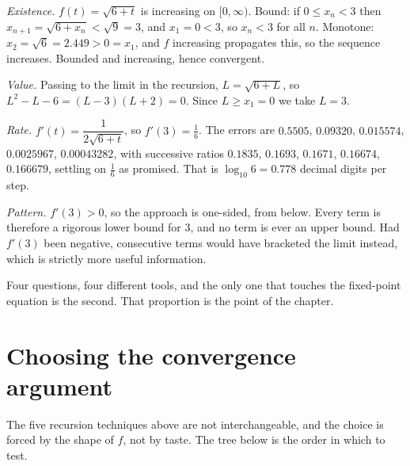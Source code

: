 \emph{Existence.} $f(t)=\sqrt{6+t}$ is increasing on $[0,\infty)$. Bound: if $0\leq x_n<3$ then $x_{n+1}=\sqrt{6+x_n}<\sqrt9=3$, and $x_1=0<3$, so $x_n<3$ for all $n$. Monotone: $x_2=\sqrt6=2.449>0=x_1$, and $f$ increasing propagates this, so the sequence increases. Bounded and increasing, hence convergent.

\emph{Value.} Passing to the limit in the recursion, $L=\sqrt{6+L}$, so $L^2-L-6=(L-3)(L+2)=0$. Since $L\geq x_1=0$ we take $L=3$.

\emph{Rate.} $f'(t)=\dfrac{1}{2\sqrt{6+t}}$, so $f'(3)=\tfrac16$. The errors are $0.5505$, $0.09320$, $0.015574$, $0.0025967$, $0.00043282$, with successive ratios $0.1835$, $0.1693$, $0.1671$, $0.16674$, $0.166679$, settling on $\tfrac16$ as promised. That is $\log_{10}6=0.778$ decimal digits per step.

\emph{Pattern.} $f'(3)>0$, so the approach is one-sided, from below. Every term is therefore a rigorous lower bound for $3$, and no term is ever an upper bound. Had $f'(3)$ been negative, consecutive terms would have bracketed the limit instead, which is strictly more useful information.

Four questions, four different tools, and the only one that touches the fixed-point equation is the second. That proportion is the point of the chapter.

\section{Choosing the convergence argument}

The five recursion techniques above are not interchangeable, and the choice is forced by the shape of $f$, not by taste. The tree below is the order in which to test.

\begin{center}
\end{center}

